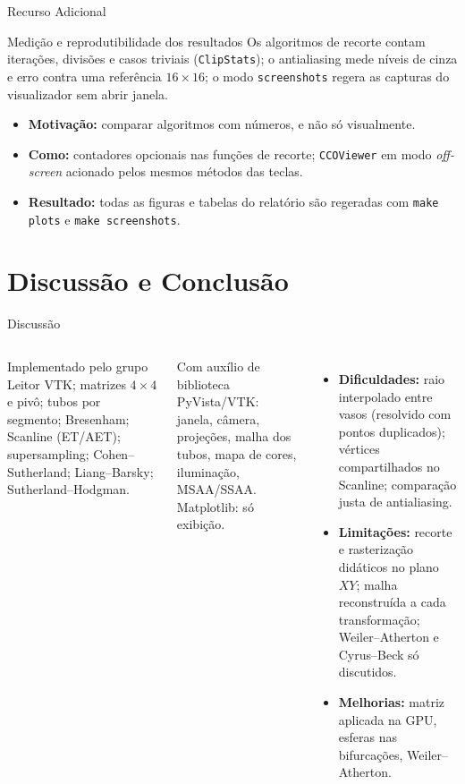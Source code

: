 \documentclass[aspectratio=169,11pt]{beamer}
\begin{document}
\begin{frame}{Recurso Adicional}
\begin{block}{Medição e reprodutibilidade dos resultados}
Os algoritmos de recorte contam iterações, divisões e casos triviais (\texttt{ClipStats}); o antialiasing mede níveis de cinza e erro contra uma referência $16\times16$; o modo \texttt{screenshots} regera as capturas do visualizador sem abrir janela.
\end{block}

\begin{itemize}
  \item \textbf{Motivação:} comparar algoritmos com números, e não só visualmente.
  \item \textbf{Como:} contadores opcionais nas funções de recorte; \texttt{CCOViewer} em modo \emph{off-screen} acionado pelos mesmos métodos das teclas.
  \item \textbf{Resultado:} todas as figuras e tabelas do relatório são regeradas com \texttt{make plots} e \texttt{make screenshots}.
\end{itemize}
\end{frame}

\section{Discussão e Conclusão}

\begin{frame}{Discussão}
\begin{columns}[T]
\small
\begin{block}{Implementado pelo grupo}
Leitor VTK; matrizes $4\times4$ e pivô; tubos por segmento; Bresenham; Scanline (ET/AET); supersampling; Cohen--Sutherland; Liang--Barsky; Sutherland--Hodgman.
\end{block}
\begin{block}{Com auxílio de biblioteca}
PyVista/VTK: janela, câmera, projeções, malha dos tubos, mapa de cores, iluminação, MSAA/SSAA. Matplotlib: só exibição.
\end{block}
\small
\begin{itemize}
  \item \textbf{Dificuldades:} raio interpolado entre vasos (resolvido com pontos duplicados); vértices compartilhados no Scanline; comparação justa de antialiasing.
  \item \textbf{Limitações:} recorte e rasterização didáticos no plano $XY$; malha reconstruída a cada transformação; Weiler--Atherton e Cyrus--Beck só discutidos.
  \item \textbf{Melhorias:} matriz aplicada na GPU, esferas nas bifurcações, Weiler--Atherton.
\end{itemize}
\end{columns}
\end{frame}
\end{document}
